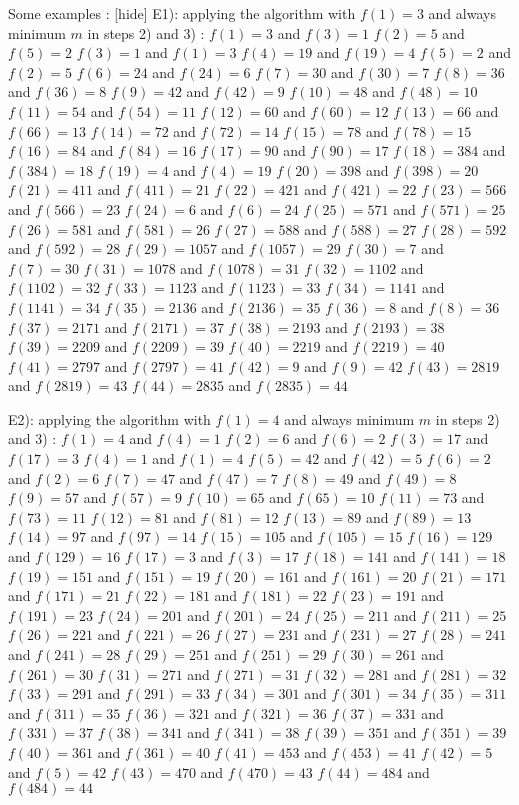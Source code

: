 \begin{solution}
	\begin{tcolorbox}

Some examples :
[hide]
E1): applying the algorithm with $f(1)=3$ and always minimum $m$ in steps 2) and 3) :
$f(1)=3$ and $f(3)=1$
$f(2)=5$ and $f(5)=2$
$f(3)=1$ and $f(1)=3$
$f(4)=19$ and $f(19)=4$
$f(5)=2$ and $f(2)=5$
$f(6)=24$ and $f(24)=6$
$f(7)=30$ and $f(30)=7$
$f(8)=36$ and $f(36)=8$
$f(9)=42$ and $f(42)=9$
$f(10)=48$ and $f(48)=10$
$f(11)=54$ and $f(54)=11$
$f(12)=60$ and $f(60)=12$
$f(13)=66$ and $f(66)=13$
$f(14)=72$ and $f(72)=14$
$f(15)=78$ and $f(78)=15$
$f(16)=84$ and $f(84)=16$
$f(17)=90$ and $f(90)=17$
$f(18)=384$ and $f(384)=18$
$f(19)=4$ and $f(4)=19$
$f(20)=398$ and $f(398)=20$
$f(21)=411$ and $f(411)=21$
$f(22)=421$ and $f(421)=22$
$f(23)=566$ and $f(566)=23$
$f(24)=6$ and $f(6)=24$
$f(25)=571$ and $f(571)=25$
$f(26)=581$ and $f(581)=26$
$f(27)=588$ and $f(588)=27$
$f(28)=592$ and $f(592)=28$
$f(29)=1057$ and $f(1057)=29$
$f(30)=7$ and $f(7)=30$
$f(31)=1078$ and $f(1078)=31$
$f(32)=1102$ and $f(1102)=32$
$f(33)=1123$ and $f(1123)=33$
$f(34)=1141$ and $f(1141)=34$
$f(35)=2136$ and $f(2136)=35$
$f(36)=8$ and $f(8)=36$
$f(37)=2171$ and $f(2171)=37$
$f(38)=2193$ and $f(2193)=38$
$f(39)=2209$ and $f(2209)=39$
$f(40)=2219$ and $f(2219)=40$
$f(41)=2797$ and $f(2797)=41$
$f(42)=9$ and $f(9)=42$
$f(43)=2819$ and $f(2819)=43$
$f(44)=2835$ and $f(2835)=44$

E2): applying the algorithm with $f(1)=4$ and always minimum $m$ in steps 2) and 3) :
$f(1)=4$ and $f(4)=1$
$f(2)=6$ and $f(6)=2$
$f(3)=17$ and $f(17)=3$
$f(4)=1$ and $f(1)=4$
$f(5)=42$ and $f(42)=5$
$f(6)=2$ and $f(2)=6$
$f(7)=47$ and $f(47)=7$
$f(8)=49$ and $f(49)=8$
$f(9)=57$ and $f(57)=9$
$f(10)=65$ and $f(65)=10$
$f(11)=73$ and $f(73)=11$
$f(12)=81$ and $f(81)=12$
$f(13)=89$ and $f(89)=13$
$f(14)=97$ and $f(97)=14$
$f(15)=105$ and $f(105)=15$
$f(16)=129$ and $f(129)=16$
$f(17)=3$ and $f(3)=17$
$f(18)=141$ and $f(141)=18$
$f(19)=151$ and $f(151)=19$
$f(20)=161$ and $f(161)=20$
$f(21)=171$ and $f(171)=21$
$f(22)=181$ and $f(181)=22$
$f(23)=191$ and $f(191)=23$
$f(24)=201$ and $f(201)=24$
$f(25)=211$ and $f(211)=25$
$f(26)=221$ and $f(221)=26$
$f(27)=231$ and $f(231)=27$
$f(28)=241$ and $f(241)=28$
$f(29)=251$ and $f(251)=29$
$f(30)=261$ and $f(261)=30$
$f(31)=271$ and $f(271)=31$
$f(32)=281$ and $f(281)=32$
$f(33)=291$ and $f(291)=33$
$f(34)=301$ and $f(301)=34$
$f(35)=311$ and $f(311)=35$
$f(36)=321$ and $f(321)=36$
$f(37)=331$ and $f(331)=37$
$f(38)=341$ and $f(341)=38$
$f(39)=351$ and $f(351)=39$
$f(40)=361$ and $f(361)=40$
$f(41)=453$ and $f(453)=41$
$f(42)=5$ and $f(5)=42$
$f(43)=470$ and $f(470)=43$
$f(44)=484$ and $f(484)=44$


\end{tcolorbox}
\end{solution}
